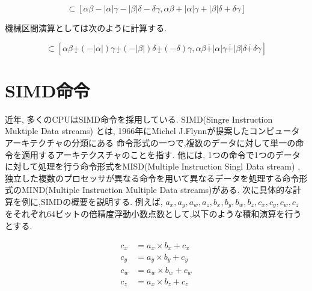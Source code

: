 \documentclass[11pt,a4paper]{jsreport}
\theoremstyle{definition}
\begin{document}
  \begin{equation*}
    [\alpha - \delta,\alpha + \delta][\beta - \gamma,\beta + \gamma] \subset [\alpha\beta - |\alpha|\gamma - |\beta|\delta - \delta\gamma,\alpha\beta + |\alpha|\gamma + |\beta|\delta + \delta\gamma]
  \end{equation*}

  機械区間演算としては次のように計算する.

  \begin{equation*}
    [\alpha - \delta,\alpha + \delta][\beta - \gamma,\beta + \gamma] \subset [\alpha\beta \underline{+} (-|\alpha|)\gamma \underline{+} (-|\beta|)\delta \underline{+} (-\delta)\gamma,\alpha\beta \overline{+} |\alpha|\gamma \overline{+} |\beta|\delta \overline{+} \delta\gamma]
  \end{equation*}
\section{SIMD命令}
  近年, 多くのCPUはSIMD命令を採用している. SIMD(Singre Instruction Muktiple Data streams)
とは, 1966年にMichel J.Flynnが提案したコンピュータアーキテクチャの分類にある
命令形式の一つで,複数のデータに対して単一の命令を適用するアーキテクスチャのことを指す. 
他には, 1つの命令で1つのデータに対して処理を行う命令形式をMISD(Multiple Instruction Singl Data stream)
, 独立した複数のプロセッサが異なる命令を用いて異なるデータを処理する命令形式のMIND(Multiple Instruction Multiple Data streams)がある.
  次に具体的な計算を例に,SIMDの概要を説明する. 例えば, $a_x,a_y,a_w,a_z,b_x,b_y,b_w,b_z,c_x,c_y,c_w,c_z$
をそれぞれ64ビットの倍精度浮動小数点数として,以下のような積和演算を行うとする.

\begin{align*}
 c_x &= a_x \times b_x + c_x \\
 c_y &= a_y \times b_y + c_y \\
 c_w &= a_w \times b_w + c_w \\
 c_z &= a_x \times b_z + c_z
\end{align*}
\end{document}
